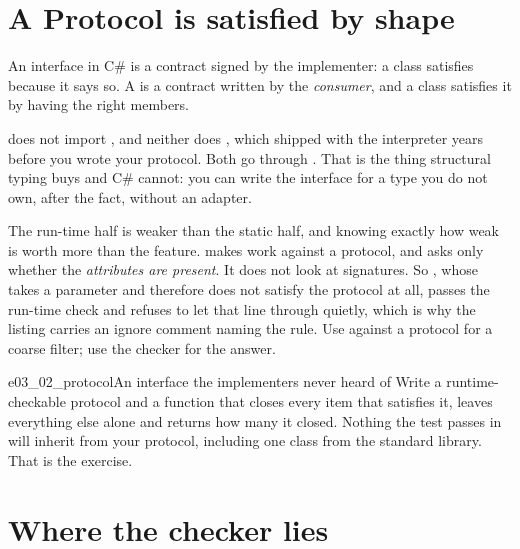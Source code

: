 \section{A Protocol is satisfied by shape}
\label{sec:ch03-protocol}

An interface in C\# is a contract signed by the implementer: a class
satisfies  because it says so. A  is a
contract written by the \emph{consumer}, and a class satisfies it by having
the right members.


\noindent
{} does not import , and neither does
, which shipped with the interpreter years before you wrote
your protocol. Both go through . That is the thing structural
typing buys and C\# cannot: you can write the interface for a type you do not
own, after the fact, without an adapter.

The run-time half is weaker than the static half, and knowing exactly how
weak is worth more than the feature.  makes
 work against a protocol, and  asks only
whether the \emph{attributes are present}. It does not look at signatures. So
, whose  takes a parameter and therefore does not
satisfy the protocol at all, passes the run-time check \dash{} and
 refuses to let that line through quietly, which is why the
listing carries an ignore comment naming the rule. Use 
against a protocol for a coarse filter; use the checker for the answer.

\begin{exercise}{e03_02_protocol}{An interface the implementers never heard of}
Write a runtime-checkable  protocol and a function that closes
every item that satisfies it, leaves everything else alone and returns how
many it closed. Nothing the test passes in will inherit from your protocol,
including one class from the standard library. That is the exercise.
\end{exercise}

\section{Where the checker lies}
\label{sec:ch03-lies}

